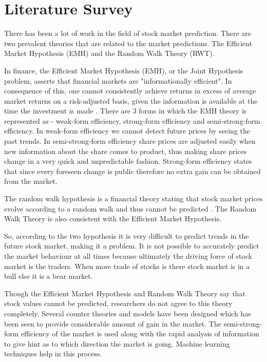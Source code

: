 \documentclass[a4paper,12bp]{report}
\begin{document}
\chapter{Literature Survey}

There has been a lot of work in the field of stock market prediction. There are two prevalent theories that are related to the market predictions. The Efficient Market Hypothesis (EMH) and the Random Walk Theory (RWT).

In finance, the Efficient Market Hypothesis (EMH), or the Joint Hypothesis problem, asserts that financial markets are "informationally efficient". In consequence of this, one cannot consistently achieve returns in excess of average market returns on a risk-adjusted basis, given the information is available at the time the investment is made \cite{ wiki:20141}. There are 3 forms in which the EMH theory is represented as - weak-form efficiency, strong-form efficiency and semi-strong-form efficiency. In weak-form efficiency we cannot detect future prices by seeing the past trends. In semi-strong-form efficiency share prices are adjusted easily when new information about the share comes to product, thus making share prices change in a very quick and unpredictable fashion. Strong-form efficiency states that since every foreseen change is public therefore no extra gain can be obtained from the market. 

The random walk hypothesis is a financial theory stating that stock market prices evolve according to a random walk and thus cannot be predicted \cite{ wiki:20142}. The Random Walk Theory is also consistent with the Efficient Market Hypothesis. 

So, according to the two hypothesis it is very difficult to predict trends in the future stock market, making it a problem. It is not possible to accurately predict the market behaviour at all times because ultimately the driving force of stock market is the traders. When more trade of stocks is there stock market is in a bull else it is a bear market. 

Though the Efficient Market Hypothesis and Random Walk Theory say that stock values cannot be predicted, researchers do not agree to this theory completely. Several counter theories and models have been designed which has been seen to provide considerable amount of gain in the market. The semi-strong-form efficiency of the market is used along with the rapid analysis of information to give hint as to which direction the market is going. Machine learning techniques help in this process. 
\end{document}
